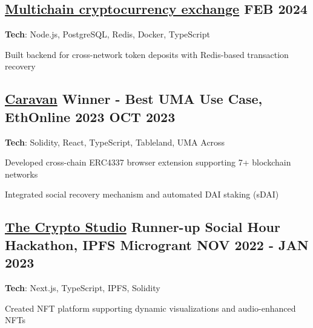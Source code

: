\documentclass[letter,10pt]{article}
\begin{document}
\subsection{{ \href{https://github.com/Suhel-Kap/crypto-exchanger}{Multichain cryptocurrency exchange} \hfill FEB 2024}}
\begin{zitemize}
  \item \textbf{Tech}: Node.js, PostgreSQL, Redis, Docker, TypeScript
  \item Built backend for cross-network token deposits with Redis-based transaction recovery
\end{zitemize}

\subsection{{ \href{https://github.com/0xabh/caravan}{Caravan} Winner - Best UMA Use Case, EthOnline 2023 \hfill OCT 2023}}
\begin{zitemize}
  \item \textbf{Tech}: Solidity, React, TypeScript, Tableland, UMA Across
  \item Developed cross-chain ERC4337 browser extension supporting 7+ blockchain networks
  \item Integrated social recovery mechanism and automated DAI staking (sDAI)
\end{zitemize}


\subsection{{ \href{https://github.com/Suhel-Kap/the-crypto-studio}{The Crypto Studio} Runner-up Social Hour Hackathon, IPFS Microgrant \hfill NOV 2022 - JAN 2023}}
\begin{zitemize}
  \item \textbf{Tech}: Next.js, TypeScript, IPFS, Solidity
  \item Created NFT platform supporting dynamic visualizations and audio-enhanced NFTs
\end{zitemize}
\end{document}
